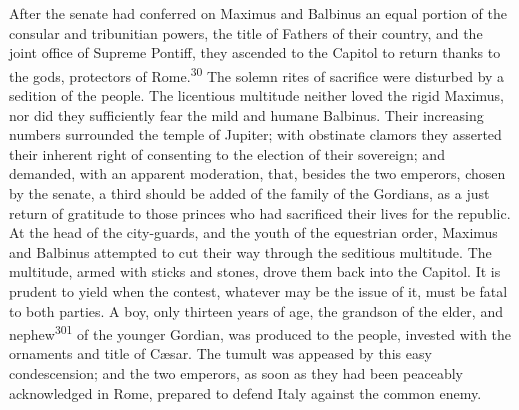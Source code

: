 After the senate had conferred on Maximus and Balbinus an equal
portion of the consular and tribunitian powers, the title of
Fathers of their country, and the joint office of Supreme
Pontiff, they ascended to the Capitol to return thanks to the
gods, protectors of Rome.\textsuperscript{30} The solemn rites of sacrifice were
disturbed by a sedition of the people. The licentious multitude
neither loved the rigid Maximus, nor did they sufficiently fear
the mild and humane Balbinus. Their increasing numbers surrounded
the temple of Jupiter; with obstinate clamors they asserted their
inherent right of consenting to the election of their sovereign;
and demanded, with an apparent moderation, that, besides the two
emperors, chosen by the senate, a third should be added of the
family of the Gordians, as a just return of gratitude to those
princes who had sacrificed their lives for the republic. At the
head of the city-guards, and the youth of the equestrian order,
Maximus and Balbinus attempted to cut their way through the
seditious multitude. The multitude, armed with sticks and stones,
drove them back into the Capitol. It is prudent to yield when the
contest, whatever may be the issue of it, must be fatal to both
parties. A boy, only thirteen years of age, the grandson of the
elder, and nephew\textsuperscript{301} of the younger Gordian, was produced to the
people, invested with the ornaments and title of Cæsar. The
tumult was appeased by this easy condescension; and the two
emperors, as soon as they had been peaceably acknowledged in
Rome, prepared to defend Italy against the common enemy.



